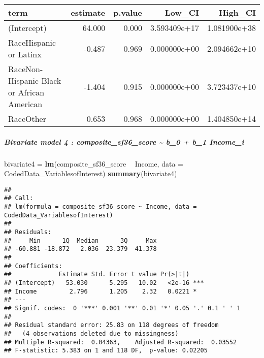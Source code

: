 \documentclass[]{article}
\newenvironment{Shaded}{\begin{snugshade}}{\end{snugshade}}
\newcommand{\DataTypeTok}[1]{\textcolor[rgb]{0.13,0.29,0.53}{#1}}
\newcommand{\DecValTok}[1]{\textcolor[rgb]{0.00,0.00,0.81}{#1}}
\newcommand{\FloatTok}[1]{\textcolor[rgb]{0.00,0.00,0.81}{#1}}
\newcommand{\KeywordTok}[1]{\textcolor[rgb]{0.13,0.29,0.53}{\textbf{#1}}}
\newcommand{\NormalTok}[1]{#1}
\newcommand{\OperatorTok}[1]{\textcolor[rgb]{0.81,0.36,0.00}{\textbf{#1}}}
\newcommand{\StringTok}[1]{\textcolor[rgb]{0.31,0.60,0.02}{#1}}
\let\oldsubparagraph\subparagraph
\renewcommand{\subparagraph}[1]{\oldsubparagraph{#1}\mbox{}}
\begin{document}
\begin{longtable}[]{@{}lrrrr@{}}
\toprule
term & estimate & p.value & Low\_CI & High\_CI\tabularnewline
\midrule
\endhead
(Intercept) & 64.000 & 0.000 & 3.593409e+17 &
1.081900e+38\tabularnewline
RaceHispanic or Latinx & -0.487 & 0.969 & 0.000000e+00 &
2.094662e+10\tabularnewline
RaceNon- Hispanic Black or African American & -1.404 & 0.915 &
0.000000e+00 & 3.723437e+10\tabularnewline
RaceOther & 0.653 & 0.968 & 0.000000e+00 & 1.404850e+14\tabularnewline
\bottomrule
\end{longtable}

\hypertarget{bivariate-model-4-composite_sf36_score-b_0-b_1-income_i}{%
\subparagraph{Bivariate model 4 : composite\_sf36\_score
\textasciitilde{} b\_0 + b\_1
Income\_i}\label{bivariate-model-4-composite_sf36_score-b_0-b_1-income_i}}

\begin{Shaded}
\begin{Highlighting}[]
\NormalTok{bivariate4 =}\StringTok{ }\KeywordTok{lm}\NormalTok{(composite_sf36_score }\OperatorTok{~}\StringTok{ }\NormalTok{Income, }\DataTypeTok{data =}\NormalTok{ CodedData_VariablesofInterest)}
\KeywordTok{summary}\NormalTok{(bivariate4)}
\end{Highlighting}
\end{Shaded}

\begin{verbatim}
## 
## Call:
## lm(formula = composite_sf36_score ~ Income, data = CodedData_VariablesofInterest)
## 
## Residuals:
##     Min      1Q  Median      3Q     Max 
## -60.881 -18.872   2.036  23.379  41.378 
## 
## Coefficients:
##             Estimate Std. Error t value Pr(>|t|)    
## (Intercept)   53.030      5.295   10.02   <2e-16 ***
## Income         2.796      1.205    2.32   0.0221 *  
## ---
## Signif. codes:  0 '***' 0.001 '**' 0.01 '*' 0.05 '.' 0.1 ' ' 1
## 
## Residual standard error: 25.83 on 118 degrees of freedom
##   (4 observations deleted due to missingness)
## Multiple R-squared:  0.04363,    Adjusted R-squared:  0.03552 
## F-statistic: 5.383 on 1 and 118 DF,  p-value: 0.02205
\end{verbatim}

\begin{Shaded}
\end{Shaded}
\end{document}
